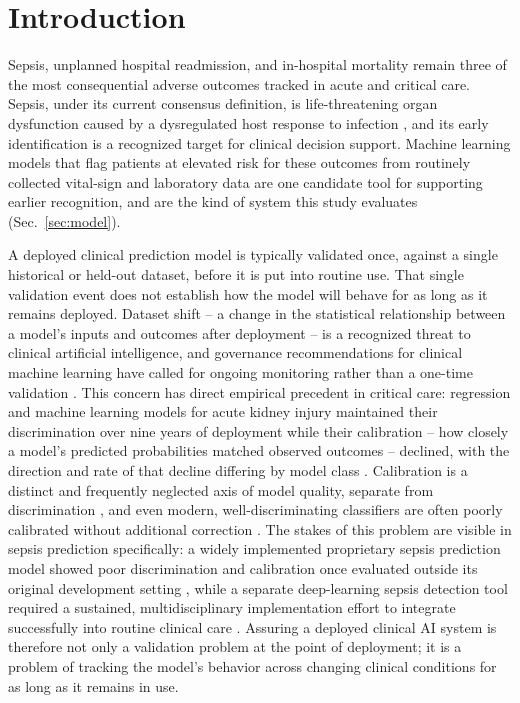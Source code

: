\documentclass[preprintsapa,article,submit,oneauthor]{Definitions/mdpi}
\begin{document}
\section{Introduction}\label{sec:introduction}

Sepsis, unplanned hospital readmission, and in-hospital mortality remain three of the most consequential adverse outcomes tracked in acute and critical care. Sepsis, under its current consensus definition, is life-threatening organ dysfunction caused by a dysregulated host response to infection \citep{singer2016}, and its early identification is a recognized target for clinical decision support. Machine learning models that flag patients at elevated risk for these outcomes from routinely collected vital-sign and laboratory data are one candidate tool for supporting earlier recognition, and are the kind of system this study evaluates (Sec.~\ref{sec:model}).

A deployed clinical prediction model is typically validated once, against a single historical or held-out dataset, before it is put into routine use. That single validation event does not establish how the model will behave for as long as it remains deployed. Dataset shift -- a change in the statistical relationship between a model's inputs and outcomes after deployment -- is a recognized threat to clinical artificial intelligence, and governance recommendations for clinical machine learning have called for ongoing monitoring rather than a one-time validation \citep{finlayson2021}. This concern has direct empirical precedent in critical care: regression and machine learning models for acute kidney injury maintained their discrimination over nine years of deployment while their calibration -- how closely a model's predicted probabilities matched observed outcomes -- declined, with the direction and rate of that decline differing by model class \citep{davis2017}. Calibration is a distinct and frequently neglected axis of model quality, separate from discrimination \citep{vancalster2019}, and even modern, well-discriminating classifiers are often poorly calibrated without additional correction \citep{guo2017}. The stakes of this problem are visible in sepsis prediction specifically: a widely implemented proprietary sepsis prediction model showed poor discrimination and calibration once evaluated outside its original development setting \citep{wong2021}, while a separate deep-learning sepsis detection tool required a sustained, multidisciplinary implementation effort to integrate successfully into routine clinical care \citep{sendak2020}. Assuring a deployed clinical AI system is therefore not only a validation problem at the point of deployment; it is a problem of tracking the model's behavior across changing clinical conditions for as long as it remains in use.
\end{document}
